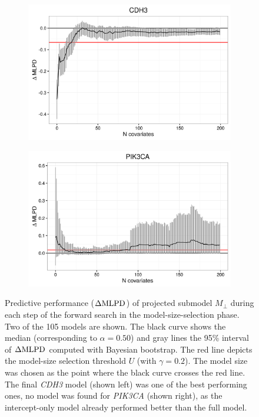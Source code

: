 \begin{figure}[!h]
  \centering
  \begin{subfigure}{.48\textwidth}
    \includegraphics[width=1\linewidth]{figures/CDH3_CV_path.png}
  \end{subfigure}
  \begin{subfigure}{.48\textwidth}
    \includegraphics[width=1\linewidth]{figures/PIK3CA_CV_path.png}
  \end{subfigure}

  \caption{Predictive performance ($\Delta\textup{MLPD}$) of projected submodel $M_\perp$ during
  each step of the forward search in the model-size-selection phase. Two of the 105 models are shown.
  The black curve shows the median (corresponding to $\alpha = 0.50$) and
  gray lines the 95\% interval of $\Delta\textup{MLPD}$ computed with Bayesian bootstrap.
  The red line depicts the model-size selection threshold $U$ (with $\gamma=0.2$).
  The model size was chosen as the point where the black curve crosses the red line.
  The final \emph{CDH3} model (shown left) was one of the best performing ones,
  no model was found for \emph{PIK3CA} (shown right), as the intercept-only model
  already performed better than the full model.}
  \label{fig:forward-search}
\end{figure}

